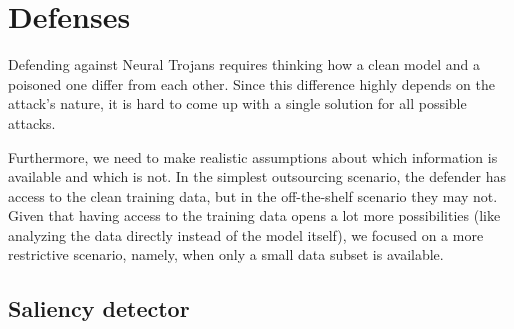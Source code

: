 \documentclass[letterpaper, 10 pt, conference]{ieeeconf}  %
\begin{document}
\section{Defenses}

Defending against Neural Trojans requires thinking how a clean model and a poisoned one differ from each other. Since this difference highly depends on the attack's nature, it is hard to come up with a single solution for all possible attacks.

Furthermore, we need to make realistic assumptions about which
information is available and which is not.  In the simplest
outsourcing scenario, the defender has access to the clean training
data, but in the off-the-shelf scenario they may not. Given that having
access to the training data opens a lot more possibilities (like analyzing
the data directly instead of the model itself), we focused on a more
restrictive scenario, namely, when only a small data subset is available.

\subsection{Saliency detector}
\end{document}
